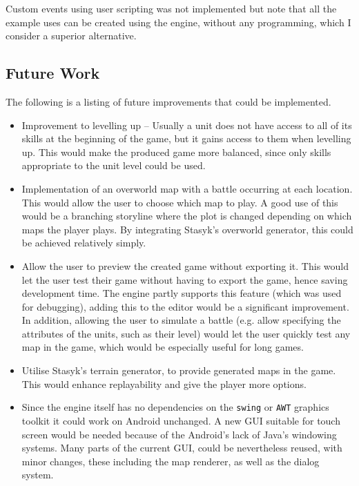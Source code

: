 Custom events using user scripting was not implemented but note that all the example uses can be created using the engine, without any programming, which I consider a superior alternative. 

\subsection{Future Work}

The following is a listing of future improvements that could be implemented. 

\begin{itemize}
\item Improvement to levelling up -- Usually a unit does not have access to all of its skills at the beginning of the game, but it gains access to them when levelling up.  This would make the produced game  more balanced, since only skills appropriate to the unit level could be used.

\item Implementation of an overworld map with a battle occurring at each location. This would allow the user to choose which map to play.  A good use of this would be a branching storyline where the plot is changed depending on which maps the player plays. By integrating Stasyk's overworld generator, this could be achieved relatively simply.
 
\item  Allow the user to preview the created game without exporting it.  This would let the user test their game without having to export the game, hence saving development time.  The engine partly supports this feature (which was used for debugging), adding this to the editor would be a significant improvement. In addition, allowing the user to simulate a battle (e.g. allow specifying the attributes of the units, such as their level)  would let the user quickly test any map in the game, which would be especially useful for long games.

\item Utilise Stasyk's terrain generator, to provide generated maps in the game. This would enhance replayability and give the player more options. 

\item Since the engine itself has no dependencies on the \texttt{swing} or \texttt{AWT} graphics toolkit it could work on Android unchanged. A new GUI suitable for touch screen would be needed because of the Android's lack of  Java's windowing systems. Many parts of the current GUI, could be nevertheless reused, with minor changes, these including the map renderer, as well as the dialog system. 

\end{itemize}

